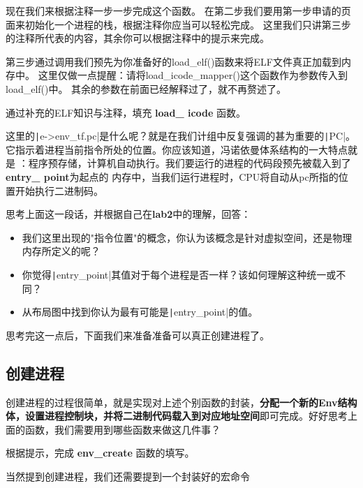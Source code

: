 现在我们来根据注释一步一步完成这个函数。
在第二步我们要用第一步申请的页面来初始化一个进程的栈，根据注释你应当可以轻松完成。
这里我们只讲第三步的注释所代表的内容，其余你可以根据注释中的提示来完成。

第三步通过调用我们预先为你准备好的load\_elf()函数来将ELF文件真正加载到内存中。
这里仅做一点提醒：请将load\_icode\_mapper()这个函数作为参数传入到load\_elf()中。
其余的参数在前面已经解释过了，就不再赘述了。

\begin{exercise}
通过补充的ELF知识与注释，填充 \textbf{load\_ icode} 函数。
\end{exercise}

这里的\texttt|e->env_tf.pc|是什么呢？就是在我们计组中反复强调的甚为重要的\texttt|PC|。
它指示着进程当前指令所处的位置。你应该知道，冯诺依曼体系结构的一大特点就是
：程序预存储，计算机自动执行。我们要运行的进程的代码段预先被载入到了\textbf{entry\_ point}为起点的
内存中，当我们运行进程时，CPU将自动从pc所指的位置开始执行二进制码。

\begin{thinking}\label{think-位置}
思考上面这一段话，并根据自己在\textbf{lab2}中的理解，回答：
  \begin{itemize}
  \item 我们这里出现的"指令位置"的概念，你认为该概念是针对虚拟空间，还是物理内存所定义的呢？
  \item 你觉得\texttt|entry_point|其值对于每个进程是否一样？该如何理解这种统一或不同？
  \item 从布局图中找到你认为最有可能是\texttt|entry_point|的值。
  \end{itemize}
\end{thinking}

思考完这一点后，下面我们来准备准备可以真正创建进程了。

\subsection{创建进程}

创建进程的过程很简单，就是实现对上述个别函数的封装，\textbf{分配一个新的Env结构体，设置进程控制块，并将二进制代码载入到对应地址空间}即可完成。好好思考上面的函数，我们需要用到哪些函数来做这几件事？

\begin{exercise}
根据提示，完成 \textbf{env\_create} 函数的填写。
\end{exercise}

当然提到创建进程，我们还需要提到一个封装好的宏命令

